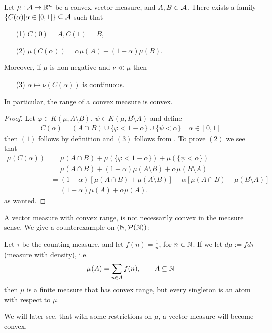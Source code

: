 \documentclass[../../main.tex]{subfiles}
\begin{document}
\begin{theorem}\label{thm: why called convex}
Let $\mu: \mathcal{A} \to \mathbb{R}^{n}$ be a convex vector measure, and $A, B \in \mathcal{A}$. There exists a family $\{ C(\alpha) | \alpha \in [0,1] \} \subseteq \mathcal{A}$ such that
\begin{itemize}
\item[(1)] $C(0)=A, C(1)=B$,
\item[(2)] $\mu(C(\alpha)) = \alpha\mu(A) + (1-\alpha) \mu(B)$.
\end{itemize}
Moreover, if $\mu$ is non-negative and $\nu \ll \mu$ then
\begin{itemize}
\item[(3)] $\alpha \mapsto \nu(C(\alpha))$ is continuous.
\end{itemize}
In particular, the range of a convex measure is convex.
\end{theorem}
\begin{proof}
Let $\varphi \in K(\mu, A \setminus B)$, $\psi \in K(\mu, B\setminus A)$ and define
\begin{align*}
	C(\alpha) = (A \cap B) \cup \{\varphi < 1-\alpha\} \cup \{\psi < \alpha\}  \quad \alpha \in [0,1]
\end{align*}
then $(1)$ follows by definition and $(3)$ follows from . To prove $(2)$ we see that
\begin{align*}
	\mu(C(\alpha))&=\mu(A\cap B) + \mu(\{\varphi<1-\alpha\}) + \mu(\{\psi<\alpha\}) \\
	&=\mu(A\cap B) + (1-\alpha)\mu(A\setminus B) + \alpha\mu(B\setminus A) \\
	&=(1-\alpha)[\mu(A\cap B) + \mu(A\setminus B)] + \alpha[\mu(A\cap B)+\mu(B\setminus A)] \\
	&=(1-\alpha)\mu(A)+\alpha\mu(A).
\end{align*}
as wanted.
\end{proof}

\begin{example}\label{convex range but not convex}
A vector measure with convex range, is not necessarily convex in the measure sense. We give a counterexample on $(\mathbb{N}, \mathcal{P}(\mathbb{N}))$: 

Let $\tau$ be the counting measure, and let $f(n)=\frac{1}{n}$, for $n\in \mathbb{N}$. If we let $d\mu:=fd\tau$ (measure with density), i.e.
\begin{align*}
	\mu(A)=\sum_{n\in A}f(n), \qquad A\subseteq \mathbb{N}
\end{align*}
then $\mu$ is a finite measure that has convex range, but every singleton is an atom with respect to $\mu$.

We will later see, that with some restrictions on $\mu$, a vector measure will become convex.
\end{example}
\end{document}
